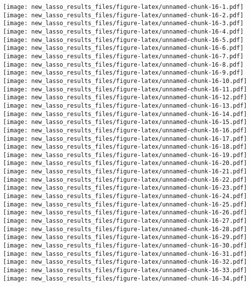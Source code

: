 \documentclass[
]{article}
\begin{document}
\texttt{[image: new\_lasso\_results\_files/figure-latex/unnamed-chunk-16-1.pdf]}
\texttt{[image: new\_lasso\_results\_files/figure-latex/unnamed-chunk-16-2.pdf]}
\texttt{[image: new\_lasso\_results\_files/figure-latex/unnamed-chunk-16-3.pdf]}
\texttt{[image: new\_lasso\_results\_files/figure-latex/unnamed-chunk-16-4.pdf]}
\texttt{[image: new\_lasso\_results\_files/figure-latex/unnamed-chunk-16-5.pdf]}
\texttt{[image: new\_lasso\_results\_files/figure-latex/unnamed-chunk-16-6.pdf]}
\texttt{[image: new\_lasso\_results\_files/figure-latex/unnamed-chunk-16-7.pdf]}
\texttt{[image: new\_lasso\_results\_files/figure-latex/unnamed-chunk-16-8.pdf]}
\texttt{[image: new\_lasso\_results\_files/figure-latex/unnamed-chunk-16-9.pdf]}
\texttt{[image: new\_lasso\_results\_files/figure-latex/unnamed-chunk-16-10.pdf]}
\texttt{[image: new\_lasso\_results\_files/figure-latex/unnamed-chunk-16-11.pdf]}
\texttt{[image: new\_lasso\_results\_files/figure-latex/unnamed-chunk-16-12.pdf]}
\texttt{[image: new\_lasso\_results\_files/figure-latex/unnamed-chunk-16-13.pdf]}
\texttt{[image: new\_lasso\_results\_files/figure-latex/unnamed-chunk-16-14.pdf]}
\texttt{[image: new\_lasso\_results\_files/figure-latex/unnamed-chunk-16-15.pdf]}
\texttt{[image: new\_lasso\_results\_files/figure-latex/unnamed-chunk-16-16.pdf]}
\texttt{[image: new\_lasso\_results\_files/figure-latex/unnamed-chunk-16-17.pdf]}
\texttt{[image: new\_lasso\_results\_files/figure-latex/unnamed-chunk-16-18.pdf]}
\texttt{[image: new\_lasso\_results\_files/figure-latex/unnamed-chunk-16-19.pdf]}
\texttt{[image: new\_lasso\_results\_files/figure-latex/unnamed-chunk-16-20.pdf]}
\texttt{[image: new\_lasso\_results\_files/figure-latex/unnamed-chunk-16-21.pdf]}
\texttt{[image: new\_lasso\_results\_files/figure-latex/unnamed-chunk-16-22.pdf]}
\texttt{[image: new\_lasso\_results\_files/figure-latex/unnamed-chunk-16-23.pdf]}
\texttt{[image: new\_lasso\_results\_files/figure-latex/unnamed-chunk-16-24.pdf]}
\texttt{[image: new\_lasso\_results\_files/figure-latex/unnamed-chunk-16-25.pdf]}
\texttt{[image: new\_lasso\_results\_files/figure-latex/unnamed-chunk-16-26.pdf]}
\texttt{[image: new\_lasso\_results\_files/figure-latex/unnamed-chunk-16-27.pdf]}
\texttt{[image: new\_lasso\_results\_files/figure-latex/unnamed-chunk-16-28.pdf]}
\texttt{[image: new\_lasso\_results\_files/figure-latex/unnamed-chunk-16-29.pdf]}
\texttt{[image: new\_lasso\_results\_files/figure-latex/unnamed-chunk-16-30.pdf]}
\texttt{[image: new\_lasso\_results\_files/figure-latex/unnamed-chunk-16-31.pdf]}
\texttt{[image: new\_lasso\_results\_files/figure-latex/unnamed-chunk-16-32.pdf]}
\texttt{[image: new\_lasso\_results\_files/figure-latex/unnamed-chunk-16-33.pdf]}
\texttt{[image: new\_lasso\_results\_files/figure-latex/unnamed-chunk-16-34.pdf]}
\end{document}
